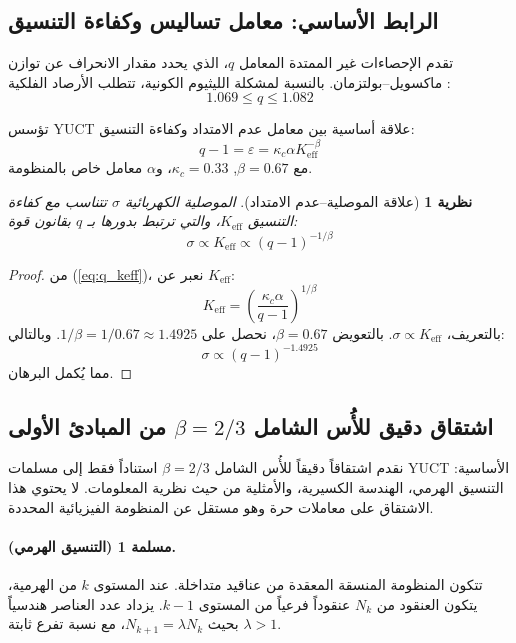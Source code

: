 \documentclass[12pt,a4paper]{article}
\newcommand{\kappac}{\kappa_c}
\newcommand{\Ke}{K_{\mathrm{eff}}}
\newcommand{\alp}{\alpha}
\newtheorem{theorem}{نظرية}[section]
\theoremstyle{remark}
\begin{document}
	\subsection{الرابط الأساسي: معامل تساليس وكفاءة التنسيق}
	
	تقدم الإحصاءات غير الممتدة \cite{tsallis1988} المعامل \(q\)، الذي يحدد مقدار الانحراف عن توازن ماكسويل–بولتزمان. بالنسبة لمشكلة الليثيوم الكونية، تتطلب الأرصاد الفلكية \cite{bertulani2015}:
	\begin{equation}
		1.069 \le q \le 1.082
		\label{eq:q_range}
	\end{equation}
	
	تؤسس YUCT علاقة أساسية بين معامل عدم الامتداد وكفاءة التنسيق:
	\begin{equation}
		q - 1 = \varepsilon = \kappac \alp \Ke^{-\beta}
		\label{eq:q_keff}
	\end{equation}
	مع \(\beta = 0.67\), \(\kappac = 0.33\)، و\(\alp\) معامل خاص بالمنظومة.
	
	\begin{theorem}[علاقة الموصلية–عدم الامتداد]
		الموصلية الكهربائية \(\sigma\) تتناسب مع كفاءة التنسيق \(\Ke\)، والتي ترتبط بدورها بـ \(q\) بقانون قوة:
		\begin{equation}
			\sigma \propto \Ke \propto (q-1)^{-1/\beta}
			\label{eq:sigma_q}
		\end{equation}
		\label{th:conductivity}
	\end{theorem}
	
	\begin{proof}
		من (\ref{eq:q_keff})، نعبر عن \(\Ke\):
		\[
		\Ke = \left( \frac{\kappac \alp}{q-1} \right)^{1/\beta}
		\]
		بالتعريف، \(\sigma \propto \Ke\). بالتعويض \(\beta = 0.67\)، نحصل على \(1/\beta = 1/0.67 \approx 1.4925\). وبالتالي:
		\[
		\sigma \propto (q-1)^{-1.4925}
		\]
		مما يُكمل البرهان.
	\end{proof}
	
	\subsection{اشتقاق دقيق للأُس الشامل \(\beta = 2/3\) من المبادئ الأولى}
	\label{subsec:beta_derivation}
	
	نقدم اشتقاقاً دقيقاً للأُس الشامل \(\beta = 2/3\) استناداً فقط إلى مسلمات YUCT الأساسية: التنسيق الهرمي، الهندسة الكسيرية، والأمثلية من حيث نظرية المعلومات. لا يحتوي هذا الاشتقاق على معاملات حرة وهو مستقل عن المنظومة الفيزيائية المحددة.
	
	\paragraph{مسلمة 1 (التنسيق الهرمي).}
	تتكون المنظومة المنسقة المعقدة من عناقيد متداخلة. عند المستوى \(k\) من الهرمية، يتكون العنقود من \(N_k\) عنقوداً فرعياً من المستوى \(k-1\). يزداد عدد العناصر هندسياً بحيث \(N_{k+1} = \lambda N_k\)، مع نسبة تفرع ثابتة \(\lambda > 1\).
	
\end{document}
